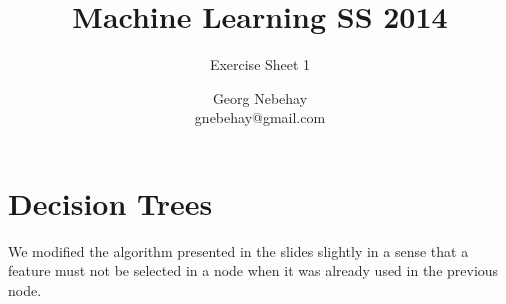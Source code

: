 \documentclass{scrartcl}
\title{Machine Learning SS 2014}
\subtitle{Exercise Sheet 1}
\author{Georg Nebehay\\gnebehay@gmail.com}
\date{}
\begin{document}
\maketitle

\section{Decision Trees}

We modified the algorithm presented in the slides slightly in a sense that
a feature must not be selected in a node when it was already used in the previous node.



\end{document}
